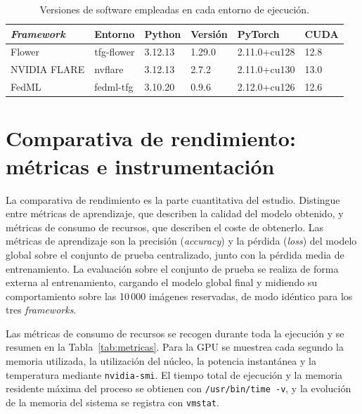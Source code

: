 \begin{table}[htbp]
  \centering
  \small
  \caption{Versiones de software empleadas en cada entorno de ejecución.}
  \label{tab:entornos}
  \begin{tabular}{llllll}
    \toprule
    \textit{Framework} & Entorno & Python & Versión & PyTorch & CUDA \\
    \midrule
    Flower       & tfg-flower & 3.12.13 & 1.29.0 & 2.11.0+cu128 & 12.8 \\
    NVIDIA FLARE & nvflare    & 3.12.13 & 2.7.2  & 2.11.0+cu130 & 13.0 \\
    FedML        & fedml-tfg  & 3.10.20 & 0.9.6  & 2.12.0+cu126 & 12.6 \\
    \bottomrule
  \end{tabular}
\end{table}

\section{Comparativa de rendimiento: métricas e instrumentación}\label{sec:metricas-rendimiento}

La comparativa de rendimiento es la parte cuantitativa del estudio. Distingue entre métricas de
aprendizaje, que describen la calidad del modelo obtenido, y métricas de consumo de recursos, que
describen el coste de obtenerlo. Las métricas de aprendizaje son la precisión (\textit{accuracy})
y la pérdida (\textit{loss}) del modelo global sobre el conjunto de prueba centralizado, junto con
la pérdida media de entrenamiento. La evaluación sobre el conjunto de prueba se realiza de forma
externa al entrenamiento, cargando el modelo global final y midiendo su comportamiento sobre las
10\,000 imágenes reservadas, de modo idéntico para los tres \textit{frameworks}.

Las métricas de consumo de recursos se recogen durante toda la ejecución y se resumen en la
Tabla~\ref{tab:metricas}. Para la GPU se muestrea cada segundo la memoria utilizada, la
utilización del núcleo, la potencia instantánea y la temperatura mediante \texttt{nvidia-smi}. El
tiempo total de ejecución y la memoria residente máxima del proceso se obtienen con
\texttt{/usr/bin/time -v}, y la evolución de la memoria del sistema se registra con
\texttt{vmstat}.

